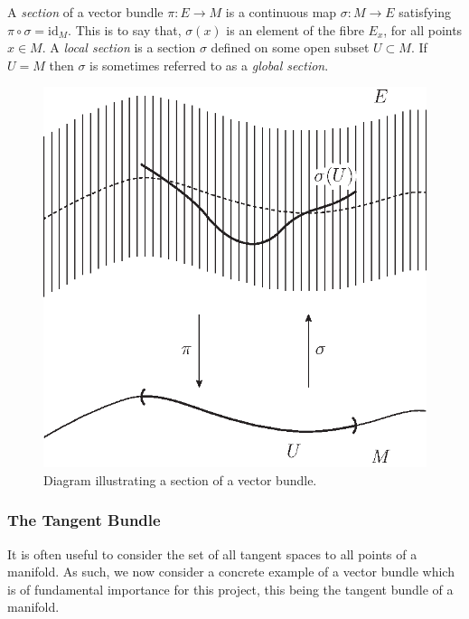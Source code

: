 \documentclass[12pt,a4paper]{article}
\begin{document}
\begin{definition}
A \textit{section} of a vector bundle $\pi:E\to M$ is a continuous map $\sigma:M\to E$ satisfying $\pi\circ\sigma=\mathrm{id}_M$. This is to say that, $\sigma(x)$ is an element of the fibre $E_x$, for all points $x\in M$. A \textit{local section} is a section $\sigma$ defined on some open subset $U\subset M$. If $U=M$ then $\sigma$ is sometimes referred to as a \textit{global section}.
\end{definition}

\begin{figure}[h!]
\centering
\includegraphics[scale=0.75]{fig/section-1}
\caption{Diagram illustrating a section of a vector bundle.}
\label{fig:section-1}
\end{figure}

\subsubsection{The Tangent Bundle}
It is often useful to consider the set of all tangent spaces to all points of a manifold. As such, we now consider a concrete example of a vector bundle which is of fundamental importance for this project, this being the tangent bundle of a manifold.

\pagebreak
\end{document}
